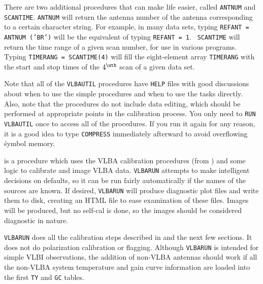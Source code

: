 There are two additional procedures that can make life easier, called
{\tt ANTNUM} and {\tt SCANTIME}\@.  {\tt ANTNUM} will return the
antenna number of the antenna corresponding to a certain character
string.  For example, in many data sets, typing {\tt REFANT = ANTNUM
('BR')} will be the equivalent of typing {\tt REFANT = 1}\@.  {\tt
SCANTIME} will return the time range of a given scan number, for use
in various programs.  Typing {\tt TIMERANG = SCANTIME(4)} will fill
the eight-element array {\tt TIMERANG} with the start and stop times
of the $4^{\uth}$ scan of a given data set.

Note that all of the {\tt VLBAUTIL} procedures have {\tt HELP} files
with good discussions about when to use the simple procedures and when
to use the tasks directly.  Also, note that the procedures do not
include data editing, which should be performed at appropriate points
in the calibration process.  You only need to {\tt RUN VLBAUTIL} once
to access all of the procedures.  If you run it again for any reason,
it is a good idea to type {\tt COMPRESS} immediately afterward
to avoid overflowing \AIPS\' symbol memory.


{\tt {}} is a procedure which uses the VLBA calibration
procedures (from {\tt {}}) and some logic to calibrate
and image VLBA data.  {\tt VLBARUN} attempts to make intelligent
decisions on defaults, so it can be run fairly automatically if the
names of the sources are known.  If desired, {\tt VLBARUN} will
produce diagnostic plot files and write them to disk, creating an HTML
file to ease examination of these files.  Images will be produced, but
no self-cal is done, so the images should be considered diagnostic in
nature.

{\tt VLBARUN} does all the calibration steps described in
 and the next few
sections.  It does not do polarization calibration or
flagging.  Although {\tt VLBARUN} is intended for simple VLBI
observations, the addition of non-VLBA antennas should work if all the
non-VLBA system temperature and gain curve information are loaded into
the first {\tt TY} and {\tt GC} tables.

